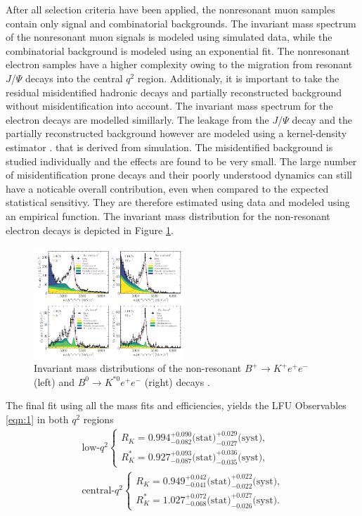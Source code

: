 \documentclass[%
 reprint,
 amsmath,amssymb,
 aps,
]{revtex4-2}
\begin{document}
After all selection criteria have been applied, the nonresonant muon samples
contain only signal and combinatorial backgrounds. The invariant mass spectrum of
the nonresonant muon signals is modeled using simulated data, while the combinatorial
background is modeled using an exponential fit.
The nonresonant electron samples have a higher complexity owing to the migration from resonant $J$/$\Psi$ decays into the central $q^2$ region. Additionaly, it is important to take the residual
misidentified hadronic decays and partially reconstructed background without misidentification into account.
The invariant mass spectrum for the electron decays are modelled simillarly. The leakage from the $J$/$\Psi$ decay and the partially reconstructed background
however are modeled using a kernel-density estimator \cite{Cranmer_2001}. 
that is derived from simulation. The misidentified background is studied individually and the effects are found to be very small. The large number 
of misidentification prone decays and their poorly understood dynamics can still have a noticable overall contribution, even when compared to the 
expected statistical sensitivy. They are therefore estimated using data and modeled using an empirical function. 
The invariant mass distribution for the non-resonant electron decays is depicted in Figure \ref{fig:4}.
\begin{figure}[ht!]
    \centering
    \includegraphics[width=0.5\textwidth]{mass.png}
    \caption{Invariant mass distributions of the non-resonant $B^+ \rightarrow K^+ e^+ e^-$ (left) and $B^0 \rightarrow K^{*0} e^+ e^-$ (right) decays \cite{lhcbcollaboration2022measurement}.}
    \label{fig:4}
\end{figure}
The final fit using all the mass fits and efficiencies, yields the LFU Observables \eqref{eqn:1} in both $q^2$ regions
\begin{equation}
    \begin{array}{r}
    \text{low-} q^2\left\{\begin{array}{l}
    R_K=0.994_{-0.082}^{+0.090}\text{(stat)}_{-0.027}^{+0.029} \text{(syst),} \\
    R_K^*=0.927_{-0.087}^{+0.093}\text{(stat)}_{-0.035}^{+0.036}\text{(syst),}
    \end{array}\right. \\
    \text {central-} q^2\left\{\begin{array}{l}
    R_K=0.949_{-0.041}^{+0.042}\text{(stat)}_{-0.022}^{+0.022}\text{(syst),} \\
    R_K^*=1.027_{-0.068}^{+0.072}\text{(stat)}_{-0.026}^{+0.027} \text{(syst).}
    \end{array}\right.
    \end{array}
    \end{equation}
\end{document}
